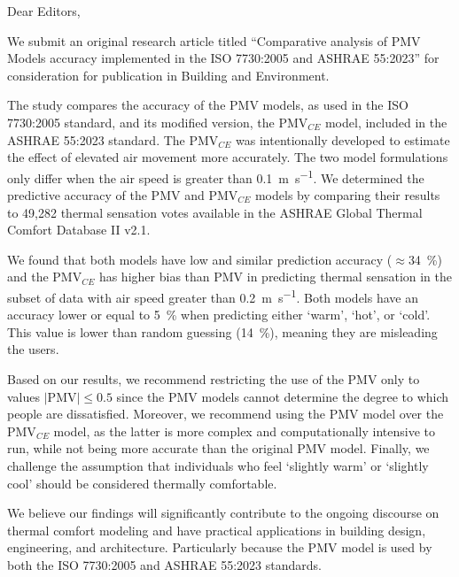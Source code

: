 \documentclass[11pt,a4paper,roman]{moderncv}        %
\begin{document}
\date{\today}
\opening{Dear Editors,}

\makelettertitle

We submit an original research article titled ``Comparative analysis of PMV Models accuracy implemented in the ISO 7730:2005 and ASHRAE 55:2023'' for consideration for publication in Building and Environment.

The study compares the accuracy of the PMV models, as used in the ISO 7730:2005 standard, and its modified version, the PMV$_{CE}$ model, included in the ASHRAE 55:2023 standard.
The PMV$_{CE}$ was intentionally developed to estimate the effect of elevated air movement more accurately.
The two model formulations only differ when the air speed is greater than \qty{0.1}{\m\per\s}.
We determined the predictive accuracy of the PMV and PMV$_{CE}$ models by comparing their results to 49,282 thermal sensation votes available in the ASHRAE Global Thermal Comfort Database II v2.1.

We found that both models have low and similar prediction accuracy ($ \approx$\qty{34}{\percent}) and the PMV$_{CE}$ has higher bias than PMV in predicting thermal sensation in the subset of data with air speed greater than \qty{0.2}{\m\per\s}.
Both models have an accuracy lower or equal to \qty{5}{\percent} when predicting either `warm', `hot', or `cold'.
This value is lower than random guessing (\qty{14}{\percent}), meaning they are misleading the users.

Based on our results, we recommend restricting the use of the PMV only to values $\lvert \textrm{PMV} \lvert \leq 0.5$ since the PMV models cannot determine the degree to which people are dissatisfied.
Moreover, we recommend using the PMV model over the PMV$_{CE}$ model, as the latter is more complex and computationally intensive to run, while not being more accurate than the original PMV model.
Finally, we challenge the assumption that individuals who feel `slightly warm' or `slightly cool' should be considered thermally comfortable.

We believe our findings will significantly contribute to the ongoing discourse on thermal comfort modeling and have practical applications in building design, engineering, and architecture.
Particularly because the PMV model is used by both the ISO 7730:2005 and ASHRAE 55:2023 standards.
\end{document}

